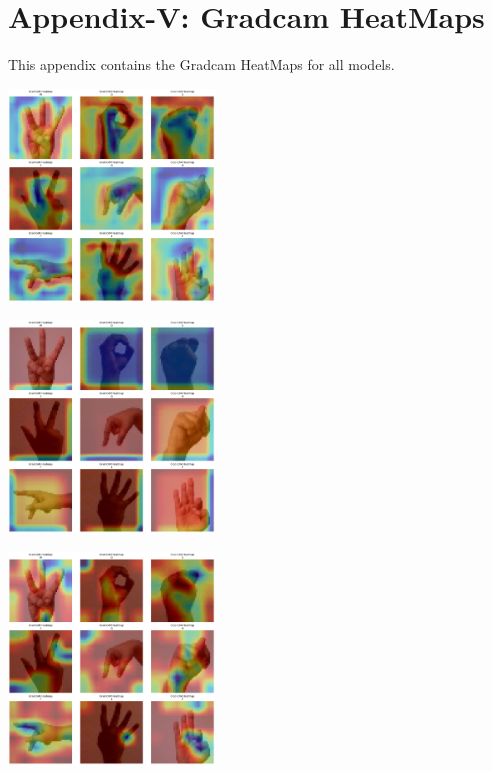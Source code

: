 \chapter*{Appendix-V: Gradcam HeatMaps}

\noindent This appendix contains the Gradcam HeatMaps for all models.

\begin{multicols}{2}
\centering

\setcounter{figure}{0} %
\renewcommand{\thefigure}{2.\arabic{figure}} %

\includegraphics[width=0.41\textwidth]{Assets/gradcam_heatmap/vgg19.png}

\vspace{0.5cm}

\includegraphics[width=0.41\textwidth]{Assets/gradcam_heatmap/CONVNEXTBASE.png}

\vspace{0.5cm}

\includegraphics[width=0.41\textwidth]{Assets/gradcam_heatmap/DenseNET121.png}


\end{multicols}
